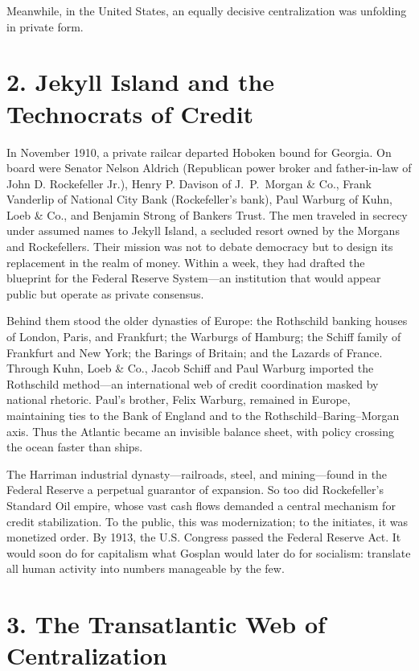 \documentclass[11pt,twoside]{book}
\begin{document}
Meanwhile, in the United States, an equally decisive centralization was unfolding in private form.

\section*{2. Jekyll Island and the Technocrats of Credit}

In November 1910, a private railcar departed Hoboken bound for Georgia.  
On board were Senator Nelson Aldrich (Republican power broker and father-in-law of John D. Rockefeller Jr.), Henry P. Davison of J.~P.~Morgan \& Co., Frank Vanderlip of National City Bank (Rockefeller’s bank), Paul Warburg of Kuhn, Loeb \& Co., and Benjamin Strong of Bankers Trust.  
The men traveled in secrecy under assumed names to Jekyll Island, a secluded resort owned by the Morgans and Rockefellers.  
Their mission was not to debate democracy but to design its replacement in the realm of money.  
Within a week, they had drafted the blueprint for the Federal Reserve System—an institution that would appear public but operate as private consensus.

Behind them stood the older dynasties of Europe: the Rothschild banking houses of London, Paris, and Frankfurt; the Warburgs of Hamburg; the Schiff family of Frankfurt and New York; the Barings of Britain; and the Lazards of France.  
Through Kuhn, Loeb \& Co., Jacob Schiff and Paul Warburg imported the Rothschild method—an international web of credit coordination masked by national rhetoric.  
Paul’s brother, Felix Warburg, remained in Europe, maintaining ties to the Bank of England and to the Rothschild–Baring–Morgan axis.  
Thus the Atlantic became an invisible balance sheet, with policy crossing the ocean faster than ships.

The Harriman industrial dynasty—railroads, steel, and mining—found in the Federal Reserve a perpetual guarantor of expansion.  
So too did Rockefeller’s Standard Oil empire, whose vast cash flows demanded a central mechanism for credit stabilization.  
To the public, this was modernization; to the initiates, it was monetized order.  
By 1913, the U.S. Congress passed the Federal Reserve Act.  
It would soon do for capitalism what Gosplan would later do for socialism: translate all human activity into numbers manageable by the few.

\section*{3. The Transatlantic Web of Centralization}
\end{document}
